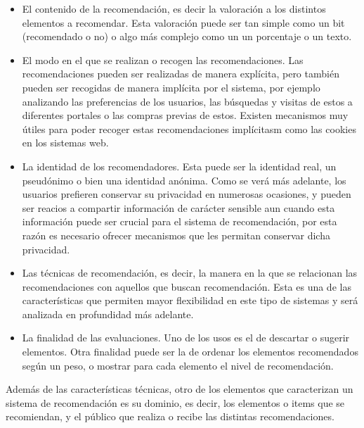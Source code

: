 \begin{itemize}
\item El contenido de la recomendación, es decir la valoración a los distintos elementos a recomendar. Esta valoración puede ser tan simple como un bit (recomendado o no) o algo más complejo como un un porcentaje o un texto.
\item El modo en el que se realizan o recogen las recomendaciones. Las recomendaciones pueden ser realizadas de manera explícita, pero también pueden ser recogidas de manera implícita por el sistema, por ejemplo analizando las preferencias de los usuarios, las búsquedas y visitas de estos a diferentes portales o las compras previas de estos. Existen mecanismos muy útiles para poder recoger estas recomendaciones implícitasm como las cookies en los sistemas web.
\item La identidad de los recomendadores. Esta puede ser la identidad real, un pseudónimo o bien una identidad anónima. Como se verá más adelante, los usuarios prefieren conservar su privacidad en numerosas ocasiones, y pueden ser reacios a compartir información de carácter sensible aun cuando esta información puede ser crucial para el sistema de recomendación, por esta razón es necesario ofrecer mecanismos que les permitan conservar dicha privacidad.
\item Las técnicas de recomendación, es decir, la manera en la que se relacionan las recomendaciones con aquellos que buscan recomendación. Esta es una de las características que permiten mayor flexibilidad en este tipo de sistemas y será analizada en profundidad más adelante.
\item La finalidad de las evaluaciones. Uno de los usos es el de descartar o sugerir elementos. Otra finalidad puede ser la de ordenar los elementos recomendados según un peso, o mostrar para cada elemento el nivel de recomendación. 
\end{itemize}

Además de las características técnicas, otro de los elementos que caracterizan un sistema de recomendación es su dominio, es decir, los elementos o items que se recomiendan, y el público que realiza o recibe las distintas recomendaciones.

